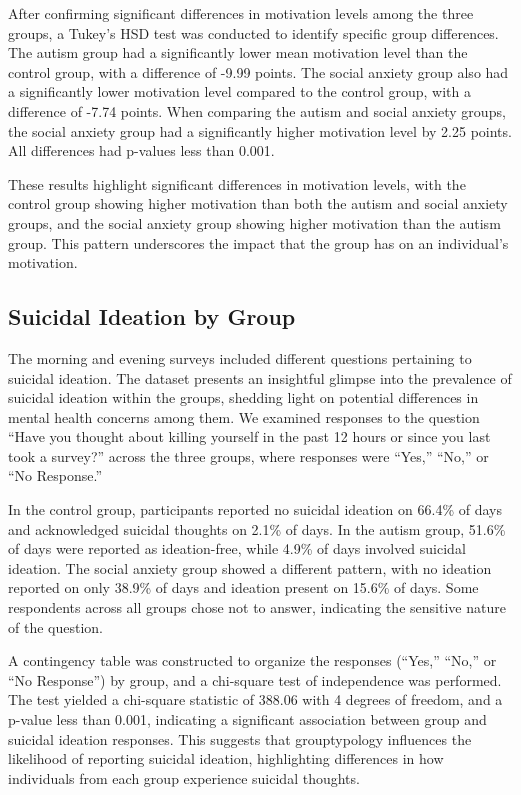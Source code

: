 \documentclass[
  letterpaper,
  number,
  review,
  3p]{elsarticle}
\begin{document}
After confirming significant differences in motivation levels among the
three groups, a Tukey's HSD test was conducted to identify specific
group differences. The autism group had a significantly lower mean
motivation level than the control group, with a difference of -9.99
points. The social anxiety group also had a significantly lower
motivation level compared to the control group, with a difference of
-7.74 points. When comparing the autism and social anxiety groups, the
social anxiety group had a significantly higher motivation level by 2.25
points. All differences had p-values less than 0.001.

These results highlight significant differences in motivation levels,
with the control group showing higher motivation than both the autism
and social anxiety groups, and the social anxiety group showing higher
motivation than the autism group. This pattern underscores the impact
that the group has on an individual's motivation.

\subsection{Suicidal Ideation by
Group}\label{suicidal-ideation-by-group}

The morning and evening surveys included different questions pertaining
to suicidal ideation. The dataset presents an insightful glimpse into
the prevalence of suicidal ideation within the groups, shedding light on
potential differences in mental health concerns among them. We examined
responses to the question ``Have you thought about killing yourself in
the past 12 hours or since you last took a survey?'' across the three
groups, where responses were ``Yes,'' ``No,'' or ``No Response.''

In the control group, participants reported no suicidal ideation on
66.4\% of days and acknowledged suicidal thoughts on 2.1\% of days. In
the autism group, 51.6\% of days were reported as ideation-free, while
4.9\% of days involved suicidal ideation. The social anxiety group
showed a different pattern, with no ideation reported on only 38.9\% of
days and ideation present on 15.6\% of days. Some respondents across all
groups chose not to answer, indicating the sensitive nature of the
question.

A contingency table was constructed to organize the responses (``Yes,''
``No,'' or ``No Response'') by group, and a chi-square test of
independence was performed. The test yielded a chi-square statistic of
388.06 with 4 degrees of freedom, and a p-value less than 0.001,
indicating a significant association between group and suicidal ideation
responses. This suggests that grouptypology influences the likelihood of
reporting suicidal ideation, highlighting differences in how individuals
from each group experience suicidal thoughts.
\end{document}
